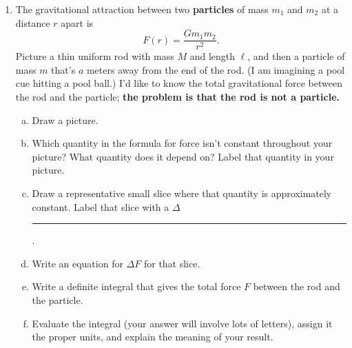\documentclass[12pt]{article}
\begin{document}
\begin{enumerate}
\item The gravitational attraction between two \textbf{particles} of mass \(m_1\) and \(m_2\) at a distance \(r\) apart is
\[F(r) = \frac{Gm_1 m_2}{r^2}.\]
Picture a thin uniform rod with mass \(M\) and length \(\ell\), and then a particle of mass \(m\) that's \(a\) meters away from the end of the rod. (I am imagining a pool cue hitting a pool ball.) I'd like to know the total gravitational force between the rod and the particle; \textbf{the problem is that the rod is not a particle.}
\begin{enumerate}[(a)]
    \item Draw a picture.
    \item Which quantity in the formula for force isn't constant throughout your picture? What quantity does it depend on? Label that quantity in your picture.
    \item Draw a representative small slice where that quantity is approximately constant. Label that slice with a \(\Delta\)\rule{0.5cm}{0.15mm}.
    \item Write an equation for \(\Delta F\) for that slice.
    \item Write a definite integral that gives the total force \(F\) between the rod and the particle.
    \item Evaluate the integral (your answer will involve lots of letters), assign it the proper units, and explain the meaning of your result.
\end{enumerate}

\end{enumerate}
\end{document}
